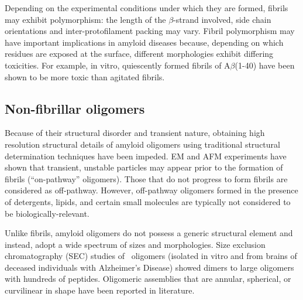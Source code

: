Depending on the experimental conditions under which they are formed, fibrils may exhibit polymorphism: the length of the $\beta$-strand involved, side chain orientations and inter-protofilament packing may vary.\cite{Kodali:2007cz} Fibril polymorphism may have important implications in amyloid diseases because, depending on which residues are exposed at the surface, different morphologies exhibit differing toxicities. For example, in vitro, quiescently formed fibrils of A$\beta$(1-40) have been shown to be more toxic than agitated fibrils.\cite{Petkova:2005p4688} 



\subsection{Non-fibrillar oligomers}

Because of their structural disorder and transient nature, obtaining high resolution structural details of amyloid oligomers using traditional structural determination techniques have been impeded.  EM and AFM experiments have shown that transient, unstable particles may appear prior to the formation of fibrils (``on-pathway'' oligomers).\cite{Chromy:2003p2575,Ahmed:2010p5694,Caughey:2003jq} Those that do not progress to form fibrils are considered as off-pathway.\cite{Kayed:2003en} However, off-pathway oligomers formed in the presence of detergents, lipids, and certain small molecules are typically not considered to be biologically-relevant.\cite{Yu:2009p2873,Laurents:2005ki}

Unlike fibrils, amyloid oligomers do not possess a generic structural element and instead, adopt a wide spectrum of sizes and morphologies. Size exclusion chromatography (SEC) studies of \ oligomers (isolated in vitro and from brains of deceased individuals with Alzheimer's Disease) showed dimers to large oligomers with hundreds of peptides.\cite{Haass:2007db,Walsh:2007fu} Oligomeric assemblies that are annular, spherical, or curvilinear in shape have been reported in literature.\cite{Haass:2007db,Kim:2009p2715,Lashuel:2002eg}

